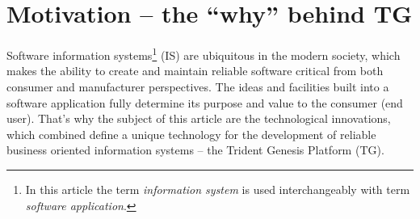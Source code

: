 \section{Motivation -- the ``why'' behind TG}\label{sec:01}
  Software information systems\footnote{In this article the term \emph{information system} is used interchangeably with term \emph{software application}.} (IS) are ubiquitous in the modern society, which makes the ability to create and maintain reliable software critical from both consumer and manufacturer perspectives.
  The ideas and facilities built into a software application fully determine its purpose and value to the consumer (end user).
  That's why the subject of this article are the technological innovations, which combined define a unique technology for the development of reliable business oriented information systems -- the Trident Genesis Platform (TG).

